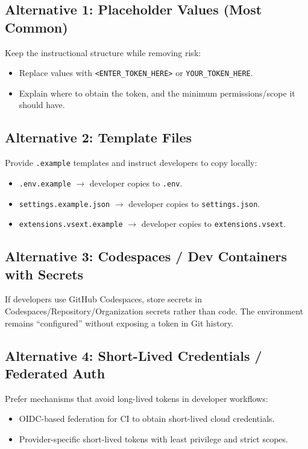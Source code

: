 \documentclass[11pt]{article}
\newcommand{\code}[1]{\texttt{#1}}
\begin{document}
\subsection{Alternative 1: Placeholder Values (Most Common)}
Keep the instructional structure while removing risk:
\begin{itemize}
  \item Replace values with \code{<ENTER\_TOKEN\_HERE>} or \code{YOUR\_TOKEN\_HERE}.
  \item Explain where to obtain the token, and the minimum permissions/scope it should have.
\end{itemize}

\subsection{Alternative 2: Template Files}
Provide \code{.example} templates and instruct developers to copy locally:
\begin{itemize}
  \item \code{.env.example} $\rightarrow$ developer copies to \code{.env}.
  \item \code{settings.example.json} $\rightarrow$ developer copies to \code{settings.json}.
  \item \code{extensions.vsext.example} $\rightarrow$ developer copies to \code{extensions.vsext}.
\end{itemize}

\subsection{Alternative 3: Codespaces / Dev Containers with Secrets}
If developers use GitHub Codespaces, store secrets in Codespaces/Repository/Organization secrets rather than code. The environment remains ``configured'' without exposing a token in Git history.

\subsection{Alternative 4: Short-Lived Credentials / Federated Auth}
Prefer mechanisms that avoid long-lived tokens in developer workflows:
\begin{itemize}
  \item OIDC-based federation for CI to obtain short-lived cloud credentials.
  \item Provider-specific short-lived tokens with least privilege and strict scopes.
\end{itemize}
\end{document}
